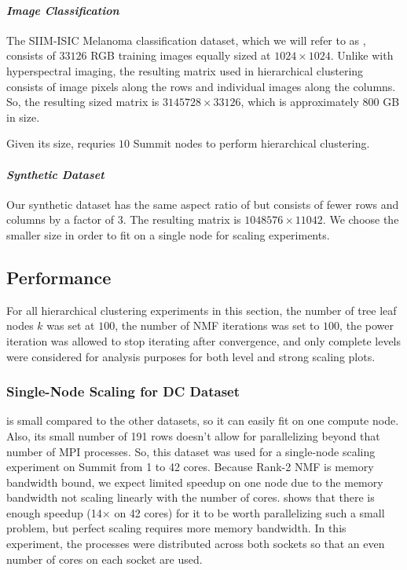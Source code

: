 	
\paragraph{\emph{Image Classification}}

	The SIIM-ISIC Melanoma classification
	dataset, which we will refer to as \image{}\cite{SIIM-ISIC}, consists of $33126$ RGB training images equally sized at $1024 \times 1024$. Unlike with hyperspectral imaging, the resulting
	matrix used in hierarchical clustering consists of image pixels along the rows and individual images along the columns. So, the resulting sized matrix is
	$3145728 \times 33126$, which is approximately 800 GB in size. 

	Given its size, \image{} requries $10$ Summit nodes to perform hierarchical clustering.
	
\paragraph{\emph{Synthetic Dataset}}

	Our synthetic dataset has the same aspect ratio of \image{} but consists of fewer rows and columns by a factor of $3$. The resulting matrix is $1048576 \times 11042$. 
	We choose the smaller size in order to fit on a single node for scaling experiments.

\subsection{Performance}
\label{sec:perf}
For all hierarchical clustering experiments in this section, the number of tree leaf nodes $k$ was set at $100$, 
the number of NMF iterations was set to $100$,
the power iteration was allowed to stop iterating after convergence,
and only complete levels were considered for analysis purposes for both level and strong scaling plots.

\subsubsection{Single-Node Scaling for DC Dataset}

\hyper{} is small compared to the other datasets, so it can easily fit on one compute node.
Also, its small number of 191 rows doesn't allow for parallelizing beyond that number of MPI processes.
So, this dataset was used for a single-node scaling experiment on Summit from 1 to 42 cores.
Because Rank-2 NMF is memory bandwidth bound, we expect limited speedup on one node due to the memory bandwidth not scaling linearly with the number of cores. 
 shows that there is enough speedup (14$\times$ on 42 cores) for it to be worth parallelizing such a small problem, but perfect scaling requires more memory bandwidth. 
In this experiment, the processes were distributed across both sockets so that an even number of cores on each socket are used.

